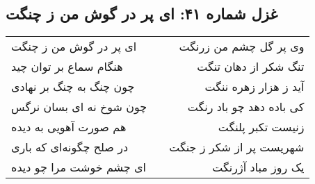 \begin{center}
\section*{غزل شماره ۴۱: ای پر در گوش من ز چنگت}
\label{sec:041}
\begin{longtable}{l p{0.5cm} r}
ای پر در گوش من ز چنگت
&&
وی پر گل چشم من زرنگت
\\
هنگام سماع بر توان چید
&&
تنگ شکر از دهان تنگت
\\
چون چنگ به چنگ بر نهادی
&&
آید ز هزار زهره ننگت
\\
چون شوخ نه ای بسان نرگس
&&
کی باده دهد چو باد رنگت
\\
هم صورت آهویی به دیده
&&
زنیست تکبر پلنگت
\\
در صلح چگونه‌ای که باری
&&
شهریست پر از شکر ز جنگت
\\
ای چشم خوشت مرا چو دیده
&&
یک روز مباد آژرنگت
\\
\end{longtable}
\end{center}
